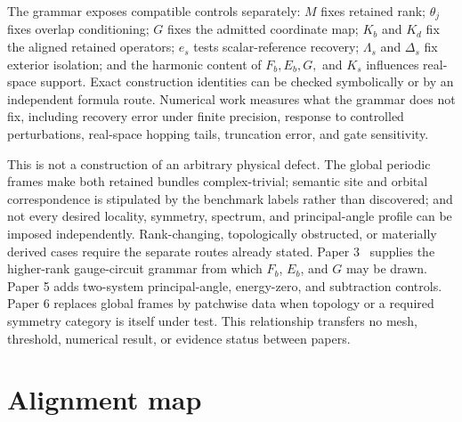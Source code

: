 \documentclass[11pt]{article}
\newenvironment{prospective}{\color{prospectivered}}{}
\begin{document}
\begin{prospective}
The grammar exposes compatible controls separately: $M$ fixes retained rank;
$\theta_j$ fixes overlap conditioning; $G$ fixes the admitted coordinate map; $K_b$ and
$K_d$ fix the aligned retained operators; $e_s$ tests scalar-reference recovery;
$\Lambda_s$ and $\Delta_s$ fix exterior isolation; and the harmonic content of
$F_b,E_b,G,$ and $K_s$ influences real-space support. Exact construction identities can
be checked symbolically or by an independent formula route. Numerical work measures
what the grammar does not fix, including recovery error under finite precision, response
to controlled perturbations, real-space hopping tails, truncation error, and gate
sensitivity.

This is not a construction of an arbitrary physical defect. The global periodic frames
make both retained bundles complex-trivial; semantic site and orbital correspondence is
stipulated by the benchmark labels rather than discovered; and not every desired
locality, symmetry, spectrum, and principal-angle profile can be imposed independently.
Rank-changing, topologically obstructed, or materially derived cases require the separate
routes already stated. Paper 3~\cite{Ragasa2026c} supplies the higher-rank gauge-circuit
grammar from which $F_b$, $E_b$, and $G$ may be drawn. Paper 5 adds two-system
principal-angle, energy-zero, and subtraction controls. Paper 6 replaces global frames
by patchwise data when topology
or a required symmetry category is itself under test. This relationship transfers no
mesh, threshold, numerical result, or evidence status between papers.

\section{Alignment map}


\end{prospective}
\end{document}
